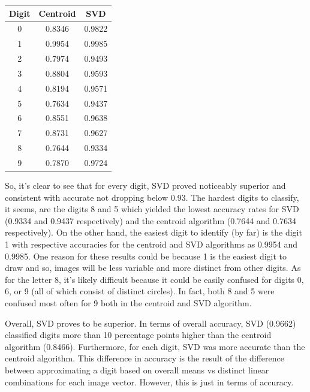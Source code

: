 \documentclass[dvipsnames,12pt]{article} %
\begin{document}
    \begin{center}
        \begin{tabular}{c|c|c}
            \hline
            Digit & Centroid & SVD \\
            \hline
            0 & 0.8346 & 0.9822 \\
            1 & 0.9954 & 0.9985 \\
            2 & 0.7974 & 0.9493 \\
            3 & 0.8804 & 0.9593 \\
            4 & 0.8194 & 0.9571 \\
            5 & 0.7634 & 0.9437 \\
            6 & 0.8551 & 0.9638 \\
            7 & 0.8731 & 0.9627 \\
            8 & 0.7644 & 0.9334 \\
            9 & 0.7870 & 0.9724 \\
        \end{tabular}
    \end{center}

    \vskip 06pt

    \hskip 12pt So, it's clear to see that for every digit, SVD proved noticeably superior and consistent with accurate not dropping below 0.93. The hardest digits to classify, it seems, are the digits 8 and 5 which yielded the lowest accuracy rates for SVD (0.9334 and 0.9437 respectively) and the centroid algorithm (0.7644 and 0.7634 respectively). On the other hand, the easiest digit to identify (by far) is the digit 1 with respective accuracies for the centroid and SVD algorithms as 0.9954 and 0.9985. One reason for these results could be because 1 is the easiest digit to draw and so, images will be less variable and more distinct from other digits. As for the letter 8, it's likely difficult because it could be easily confused for digits 0, 6, or 9 (all of which consist of distinct circles). In fact, both 8 and 5 were confused most often for 9 both in the centroid and SVD algorithm.

    \vskip 06pt

    \hskip 12pt Overall, SVD proves to be superior. In terms of overall accuracy, SVD (0.9662) classified digits more than 10 percentage points higher than the centroid algorithm (0.8466). Furthermore, for each digit, SVD was more accurate than the centroid algorithm. This difference in accuracy is the result of the difference between approximating a digit based on overall means vs distinct linear combinations for each image vector. However, this is just in terms of accuracy.
\end{document}
